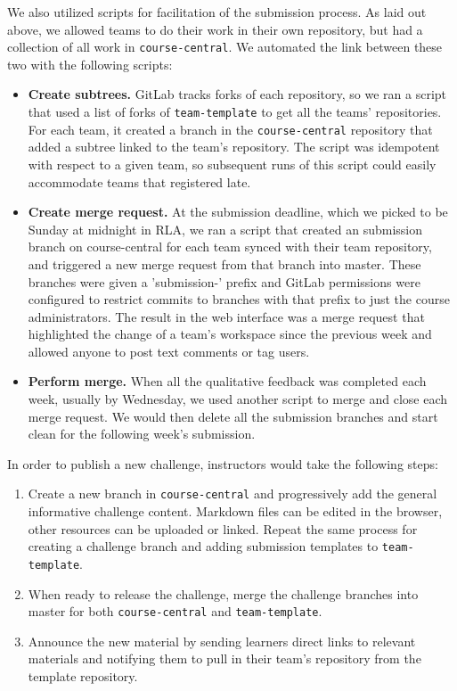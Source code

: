 \documentclass[12pt,twoside]{mitthesis}
\begin{document}
We also utilized scripts for facilitation of the submission process. As laid out above, we allowed teams to do their work in their own repository, but had a collection of all work in \texttt{course-central}. We automated the link between these two with the following scripts:
\begin{itemize}
\item \textbf{Create subtrees.} GitLab tracks forks of each repository, so we ran a script that used a list of forks of \texttt{team-template} to get all the teams' repositories. For each team, it created a branch in the \texttt{course-central} repository that added a subtree linked to the team's repository. The script was idempotent with respect to a given team, so subsequent runs of this script could easily accommodate teams that registered late.
\item \textbf{Create merge request.} At the submission deadline, which we picked to be Sunday at midnight in RLA, we ran a script that created an submission branch on course-central for each team synced with their team repository, and triggered a new merge request from that branch into master. These branches were given a 'submission-' prefix and GitLab permissions were configured to restrict commits to branches with that prefix to just the course administrators. The result in the web interface was a merge request that highlighted the change of a team's workspace since the previous week and allowed anyone to post text comments or tag users.
\item \textbf{Perform merge.} When all the qualitative feedback was completed each week, usually by Wednesday, we used another script to merge and close each merge request. We would then delete all the submission branches and start clean for the following week's submission.
\end{itemize}

In order to publish a new challenge, instructors would take the following steps:
\begin{enumerate}
\item Create a new branch in \texttt{course-central} and progressively add the general informative challenge content. Markdown files can be edited in the browser, other resources can be uploaded or linked. Repeat the same process for creating a challenge branch and adding submission templates to \texttt{team-template}.
\item When ready to release the challenge, merge the challenge branches into master for both \texttt{course-central} and \texttt{team-template}. 
\item Announce the new material by sending learners direct links to relevant materials and notifying them to pull in their team's repository from the template repository.
\end{enumerate}
\end{document}
